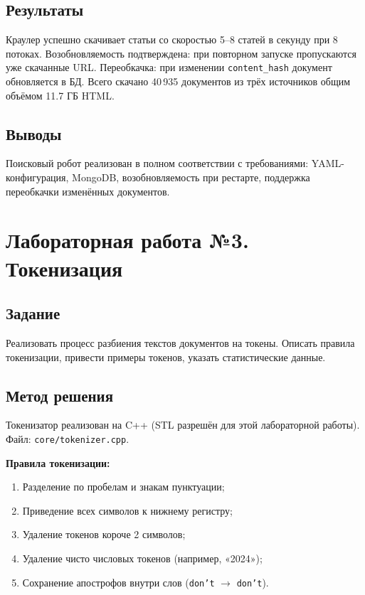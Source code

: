 \documentclass[a4paper,12pt]{article}
\begin{document}
\subsection{Результаты}

Краулер успешно скачивает статьи со скоростью 5--8 статей в секунду при 8 потоках. Возобновляемость подтверждена: при повторном запуске пропускаются уже скачанные URL. Переобкачка: при изменении \texttt{content\_hash} документ обновляется в БД. Всего скачано 40\,935 документов из трёх источников общим объёмом 11.7 ГБ HTML.

\subsection{Выводы}

Поисковый робот реализован в полном соответствии с требованиями: YAML-конфигурация, MongoDB, возобновляемость при рестарте, поддержка переобкачки изменённых документов.


\newpage
\section{Лабораторная работа №3. Токенизация}

\subsection{Задание}

Реализовать процесс разбиения текстов документов на токены. Описать правила токенизации, привести примеры токенов, указать статистические данные.

\subsection{Метод решения}

Токенизатор реализован на C++ (STL разрешён для этой лабораторной работы). Файл: \texttt{core/tokenizer.cpp}.

\textbf{Правила токенизации:}
\begin{enumerate}
    \item Разделение по пробелам и знакам пунктуации;
    \item Приведение всех символов к нижнему регистру;
    \item Удаление токенов короче 2 символов;
    \item Удаление чисто числовых токенов (например, «2024»);
    \item Сохранение апострофов внутри слов (\texttt{don't} $\rightarrow$ \texttt{don't}).
\end{enumerate}
\end{document}
